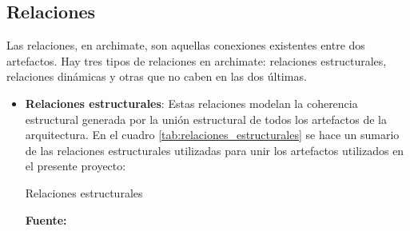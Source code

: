 \subsection{Relaciones}

Las relaciones, en archimate, son aquellas conexiones existentes entre dos artefactos. Hay tres tipos de relaciones en archimate: relaciones estructurales, relaciones dinámicas y otras que no caben en las dos últimas.

\begin{itemize}

\item \textbf{Relaciones estructurales}: Estas relaciones modelan la coherencia estructural generada por la unión estructural de todos los artefactos de la arquitectura. En el cuadro \ref{tab:relaciones_estructurales} se hace un sumario de las relaciones estructurales utilizadas para unir los artefactos utilizados en el presente proyecto:

\begin{table}
  \caption{Relaciones estructurales}
  \label{tab:relaciones_estructurales}

  \begin{center}
  
  \textbf{Fuente:} \cite{archimate2}
  

\end{center}
\end{table}
\end{itemize}
